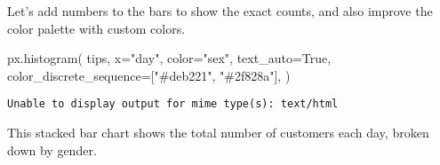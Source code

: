 \documentclass[
  letterpaper,
  DIV=11,
  numbers=noendperiod]{scrreprt}
\newenvironment{Shaded}{\begin{snugshade}}{\end{snugshade}}
\newcommand{\NormalTok}[1]{\textcolor[rgb]{0.00,0.23,0.31}{#1}}
\newcommand{\OperatorTok}[1]{\textcolor[rgb]{0.37,0.37,0.37}{#1}}
\newcommand{\StringTok}[1]{\textcolor[rgb]{0.13,0.47,0.30}{#1}}
\newcommand{\VariableTok}[1]{\textcolor[rgb]{0.07,0.07,0.07}{#1}}
\begin{document}
Let's add numbers to the bars to show the exact counts, and also improve
the color palette with custom colors.

\begin{Shaded}
\begin{Highlighting}[]
\NormalTok{px.histogram(}
\NormalTok{    tips,}
\NormalTok{    x}\OperatorTok{=}\StringTok{"day"}\NormalTok{,}
\NormalTok{    color}\OperatorTok{=}\StringTok{"sex"}\NormalTok{,}
\NormalTok{    text\_auto}\OperatorTok{=}\VariableTok{True}\NormalTok{,}
\NormalTok{    color\_discrete\_sequence}\OperatorTok{=}\NormalTok{[}\StringTok{"\#deb221"}\NormalTok{, }\StringTok{"\#2f828a"}\NormalTok{],}
\NormalTok{)}
\end{Highlighting}
\end{Shaded}

\begin{verbatim}
Unable to display output for mime type(s): text/html
\end{verbatim}

This stacked bar chart shows the total number of customers each day,
broken down by gender.
\end{document}
